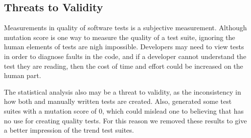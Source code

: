 \subsection{Threats to Validity}
Measurements in quality of software tests is a subjective measurement. Although mutation score is one way to measure the quality of a test suite, ignoring the human elements of tests are nigh impossible. Developers may need to view tests in order to diagnose faults in the code, and if a developer cannot understand the test they are reading, then the cost of time and effort could be increased on the human part.

The statistical analysis also may be a threat to validity, as the inconsistency in how both \evo and manually written tests are created. Also, \codepro generated some test suites with a mutation score of 0, which could mislead one to believing that \codepro has no use for creating quality tests. For this reason we removed these results to give a better impression of the trend \codepro test suites.
